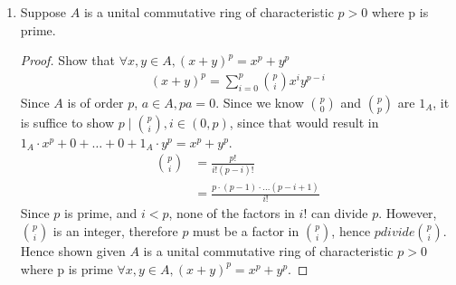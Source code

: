 \documentclass[12pt]{article}
\begin{document}
\begin{enumerate}
\begin{proof}
				\paragraph{Injective:} Define inverse of $f$: 
				\begin{align*}
				f^{-1}: \left\{\begin{bmatrix}a & 2b
				\\ b & a \end{bmatrix} \mid a,b \in \mathbb{Z}\right\} &\mapsto \mathbb{Z}[\sqrt{2}]\\
				f^{-1}\left(\begin{bmatrix}a & 2b \\ b & a \end{bmatrix}\right) &= a +
				b\sqrt{2} 
				\end{align*}
				This is well defined because $f^{-1}$ maps every element of the domain
				to a single value in the codomain.\\
				Hence shown $f: \mathbb{Z}[\sqrt{2}] \mapsto \left\{\begin{bmatrix}a & 2b
				\\ b & a \end{bmatrix} \mid a,b \in \mathbb{Z}\right\}$ by $f(a +
				b\sqrt{2}) = \begin{bmatrix}a & 2b \\ b & a \end{bmatrix}$ is
				isomorphism of rings.
		\end{proof}

		\item Suppose $A$ is a unital commutative ring of characteristic $p>0$ where p
			is prime.
			\begin{proof} Show that $\forall x, y \in A, (x+y)^p=x^p + y^p$
				\begin{align*}
					(x+y)^p = \sum_{i=0}^{p} {p \choose i} x^iy^{p-i}
				\end{align*}
				Since $A$ is of order $p$, $a\in A, pa = 0$. Since we know ${p \choose
				0}$ and ${p \choose p}$ are $1_A$, it is suffice to show $p \mid {p \choose
				i}, i \in (0, p)$, since that would result in $1_A \cdot x^p + 0 + \dots + 0 +
				1_A \cdot y^p = x^p + y^p$.
				\begin{align*}
					p \choose i &= \frac{p!}{i!(p-i)!} \\
					&= \frac{p \cdot (p-1) \cdot \dots (p-i+1)} {i!}
				\end{align*}
				Since $p$ is prime, and $i < p$, none of the factors in $i!$ can divide
				$p$. However, ${p \choose i}$ is an integer, therefore $p$ must be a
				factor in ${p \choose i}$, hence $p divide {p \choose i}$.\\
				Hence shown given $A$ is a unital commutative ring of characteristic
				$p>0$ where p is prime $\forall x, y \in A, (x+y)^p=x^p + y^p$.
			\end{proof}


\end{enumerate}
\end{document}
